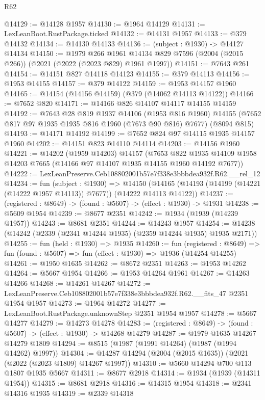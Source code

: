 \begin{lexlean}{R62}
\begin{coremodule}
@14129 := @14128 @1957
@14130 := @1964 @14129
@14131 := LexLeanBoot.RustPackage.ticked
@14132 := @14131 @1957
@14133 := @379 @14132
@14134 := @14130 @14133
@14136 := (subject : @1930) -> @14127 @14134
@14150 := @1979
    @266
    @1961
    @14134
    @829
    @7596
    (@2004 (@2015 @266))
    (@2021 (@2022 (@2023 @829) @1961 @1997))
@14151 := @7643 @261
@14154 := @14151 @827 @14118 @14123
@14155 := @379 @14113
@14156 := @1953 @14155
@14157 := @379 @14122
@14159 := @1953 @14157 @1960
@14165 := @14154 (@14156 @14159) (@379 (@14062 @14113 @14122))
@14166 := @7652 @820
@14171 := @14166 @826 @14107 @14117 @14155 @14159
@14192 := @7643
    @28
    @819
    @1937
    @14106
    (@1953 @816 @1960)
    @14155
    (@7652 @817 @97 @1935 @1935 @816 @1960 (@7673 @90 @816) @7677)
    (@8094 @815)
@14193 := @14171 @14192
@14199 := @7652 @824 @97 @14115 @1935 @14157 @1960
@14202 := @14151 @823 @14110 @14114
@14203 := @14156 @1960
@14221 := @14202
    (@1959 @14203)
    @14157
    (@7653 @822 @1935 @14109 @1958 @14203 @7665 (@14166 @97 @14107 @1935 @14155 @1960 @14192 @7677))
@14222 := LexLeanPreserve.Ceb108802001b57e7f338e3bbbdea932f.R62.__rel_12
@14234 := fun (subject : @1930) =>
  @14150 (@14165 (@14193 (@14199 (@14221 (@14222 @1957 @14113)) @7677)) (@14222 @14113 @14122))
@14237 := (registered : @8649) -> (found : @5607) -> (effect : @1930) -> @1931
@14238 := @5609 @1954
@14239 := @8677 @2351
@14242 := @1934 (@1939 (@14239 @1957))
@14243 := @8681 @2351
@14244 := @14243 @1957
@14254 := @14238 (@14242 (@2339 (@2341 @14244 @1935) (@2359 @14244 @1935) @1935 @2171))
@14255 := fun (held : @1930) => @1935
@14260 := fun (registered : @8649) =>
  fun (found : @5607) => fun (effect : @1930) => @1936 (@14254 @14255)
@14261 := @1950 @1635
@14262 := @8672 @2351
@14263 := @1953 @14262
@14264 := @5667 @1954
@14266 := @1953 @14264 @1961
@14267 := @14263 @14266
@14268 := @14261 @14267
@14272 := LexLeanPreserve.Ceb108802001b57e7f338e3bbbdea932f.R62.__fits_47 @2351 @1954 @1957
@14273 := @1964 @14272
@14277 := LexLeanBoot.RustPackage.unknownStep @2351 @1954 @1957
@14278 := @5667 @14277
@14279 := @14273 @14278
@14283 := (registered : @8649) -> (found : @5607) -> (effect : @1930) -> @14268 @14279
@14287 := @1979 @1635 @14267 @14279 @1809
@14294 := @8515 (@1987 (@1991 @14264) (@1987 (@1994 @14262) @1997))
@14304 := @14287 @14294 (@2004 (@2015 @1635)) (@2021 (@2022 (@2023 @1809) @14267 @1997))
@14310 := @5660 @14294 @700 @113 @1807 @1935 @5667
@14311 := @8677 @2918
@14314 := @1934 (@1939 (@14311 @1954))
@14315 := @8681 @2918
@14316 := @14315 @1954
@14318 := @2341 @14316 @1935
@14319 := @2339 @14318

\end{coremodule}
\end{lexlean}

